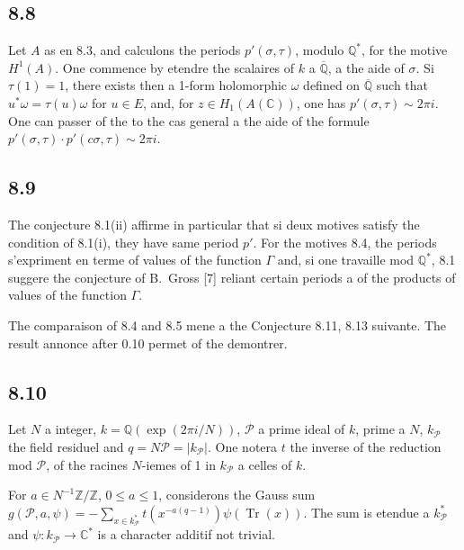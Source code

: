 \documentclass[12pt,a4paper]{article}
\theoremstyle{plain}
\theoremstyle{definition}
\theoremstyle{remark}
\DeclareMathOperator{\Tr}{Tr}
\newcommand{\Q}{\mathbb{Q}}
\newcommand{\C}{\mathbb{C}}
\newcommand{\Z}{\mathbb{Z}}
\begin{document}
\subsection*{8.8}

Let $A$ as en 8.3, and calculons the periods $p'(\sigma, \tau)$, modulo $\Q^*$, for the
motive $H^1(A)$. One commence by etendre the scalaires of $k$ a $\overline{\Q}$, a the aide of $\sigma$.
Si $\tau(1) = 1$, there exists then a 1-form holomorphic $\omega$ defined on $\overline{\Q}$ such that
$u^* \omega = \tau(u) \omega$ for $u \in E$, and, for $z \in H_1(A(\C))$, one has $p'(\sigma, \tau) \sim 2\pi i$.
One can passer of the to the cas general a the aide of the formule
$p'(\sigma, \tau) \cdot p'(c\sigma, \tau) \sim 2\pi i$.

\subsection*{8.9}

The conjecture 8.1(ii) affirme in particular that si deux motives satisfy the
condition of 8.1(i), they have same period $p'$. For the motives 8.4, the periods
s'expriment en terme of values of the function $\Gamma$ and, si one travaille mod $\Q^*$,
8.1 suggere the conjecture of B.~Gross [7] reliant certain periods a of the products
of values of the function $\Gamma$.

The comparaison of 8.4 and 8.5 mene a the Conjecture 8.11, 8.13 suivante. The result
annonce after 0.10 permet of the demontrer.

\subsection*{8.10}

Let $N$ a integer, $k = \Q(\exp(2\pi i/N))$, $\mathcal{P}$ a prime ideal of $k$, prime
a $N$, $k_\mathcal{P}$ the field residuel and $q = N\mathcal{P} = |k_\mathcal{P}|$. One notera $t$ the inverse of the reduction
mod $\mathcal{P}$, of the racines $N$-iemes of 1 in $k_\mathcal{P}$ a celles of $k$.

For $a \in N^{-1}\Z/\Z$, $0 \leq a \leq 1$, considerons the Gauss sum
$g(\mathcal{P}, a, \psi) = -\sum_{x \in k_\mathcal{P}^*} t(x^{-a(q-1)}) \psi(\Tr(x))$. The sum is etendue a
$k_\mathcal{P}^*$ and $\psi: k_\mathcal{P} \to \C^*$ is a character additif not trivial.
\end{document}
